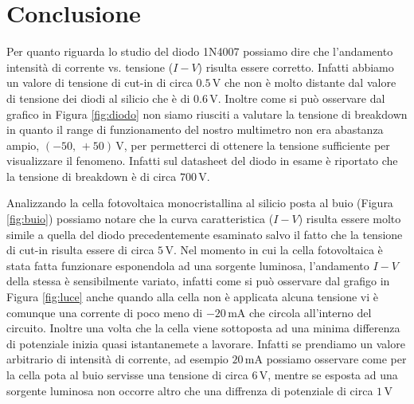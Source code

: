 \section*{Conclusione}

Per quanto riguarda lo studio del diodo 1N4007 possiamo dire che l'andamento intensità di corrente vs. tensione ($I-V$) risulta essere corretto. Infatti abbiamo un valore di tensione di cut-in di circa $0.5\,\si{\volt}$ che non è molto distante dal valore di tensione dei diodi al silicio che è di $0.6\,\si{\volt}$.
Inoltre come si può osservare dal grafico in Figura \ref{fig:diodo} non siamo riusciti a valutare la tensione di breakdown in quanto il range di funzionamento del nostro multimetro non era abastanza ampio, $(-50,\,+50)\,\si{\volt}$, per permetterci di ottenere la tensione sufficiente per visualizzare il fenomeno. Infatti sul datasheet del diodo in esame è riportato che la tensione di breakdown è di circa $700\,\si{\volt}$.

Analizzando la cella fotovoltaica monocristallina al silicio posta al buio (Figura \ref{fig:buio}) possiamo notare che la curva caratteristica ($I-V$) risulta essere molto simile a quella del diodo precedentemente esaminato salvo il fatto che la tensione di cut-in risulta essere di circa $5\,\si{\volt}$.
Nel momento in cui la cella fotovoltaica è stata fatta funzionare esponendola ad una sorgente luminosa, l'andamento $I-V$ della stessa è sensibilmente variato, infatti come si può osservare dal grafigo in Figura \ref{fig:luce} anche quando alla cella non è applicata alcuna tensione vi è comunque una corrente di poco meno di $-20\,\si{\milli\ampere}$ che circola all'interno del circuito.
Inoltre una volta che la cella viene sottoposta ad una minima differenza di potenziale inizia quasi istantanemete a lavorare. Infatti se prendiamo un valore arbitrario di intensità di corrente, ad esempio $20\,\si{\milli\ampere}$ possiamo osservare come per la cella pota al buio servisse una tensione di circa $6\,\si{\volt}$, mentre se esposta ad una sorgente luminosa non occorre altro che una diffrenza di potenziale di circa $1\,\si{\volt}$